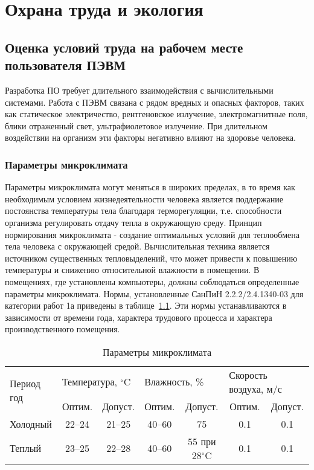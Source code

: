 \chapter{Охрана труда и экология}

\section{Оценка условий труда на рабочем месте пользователя ПЭВМ}

Разработка ПО требует длительного взаимодействия с вычислительными системами. Работа с ПЭВМ связана с рядом вредных и опасных факторов, таких как статическое электричество, рентгеновское излучение, электромагнитные поля, блики отраженный свет, ультрафиолетовое излучение. При длительном воздействии на организм эти факторы негативно влияют на здоровье человека.

\subsection{Параметры микроклимата}

Параметры микроклимата могут меняться в широких пределах, в то время как необходимым условием жизнедеятельности человека является поддержание постоянства температуры тела благодаря терморегуляции, т.е. способности организма регулировать отдачу тепла в окружающую среду. Принцип нормирования микроклимата - создание оптимальных условий для теплообмена
тела человека с окружающей  средой. Вычислительная техника является источником существенных тепловыделений, что может привести к повышению температуры и снижению относительной влажности в помещении. В помещениях, где установлены компьютеры, должны соблюдаться определенные параметры микроклимата. Нормы, установленные СанПиН 2.2.2/2.4.1340-03 для категории работ 1а приведены в таблице~\ref{tab:microclimate}. Эти нормы устанавливаются в зависимости от времени года, характера трудового процесса и характера производственного помещения.

\begin{table}[ht]
\caption{Параметры микроклимата}
\begin{tabular}{|l|c|c|c|c|c|c|}
\hline
\multirow{2}{*}{Период год} & \multicolumn{2}{l|}{Температура, $^\circ \mbox{C}$} & \multicolumn{2}{l|}{Влажность, \%} & \multicolumn{2}{l|}{Скорость воздуха, м/с} \\
\cline{2-7}
&Оптим.&Допуст.&Оптим.&Допуст.&Оптим.&Допуст.\\
\hline
Холодный &22--24&21--25&40--60&75&0.1&0.1\\
\hline
Теплый &23--25&22--28&40--60&55 при 28$^\circ \mbox{C}$&0.1&0.1\\
\hline 
\end{tabular}
\label{tab:microclimate}
\end{table}

